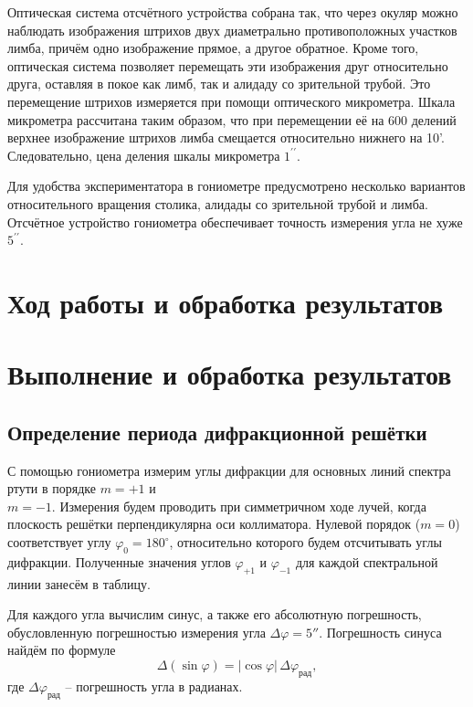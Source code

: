 \documentclass[a4paper]{article}
\begin{document}
Оптическая система отсчётного устройства собрана так, что через окуляр можно наблюдать изображения штрихов двух диаметрально противоположных участков лимба, причём одно изображение прямое, а другое обратное. Кроме того, оптическая система позволяет перемещать эти изображения друг относительно друга, оставляя в покое как лимб, так и алидаду со зрительной трубой. Это перемещение штрихов измеряется при помощи оптического микрометра. Шкала микрометра рассчитана таким образом, что при перемещении её на 600 делений верхнее изображение штрихов лимба смещается относительно нижнего на 10'. Следовательно, цена деления шкалы микрометра $1^{\prime \prime}$.

Для удобства экспериментатора в гониометре предусмотрено несколько вариантов относительного вращения столика, алидады со зрительной трубой и лимба.
Отсчётное устройство гониометра обеспечивает точность измерения угла не хуже $5^{\prime \prime}$.

\section{Ход работы и обработка результатов}

\section{Выполнение и обработка результатов}

\subsection{Определение периода дифракционной решётки}

С помощью гониометра измерим углы дифракции для основных линий спектра ртути в порядке  $m = +1$ и \\ $m = -1$. Измерения будем проводить при симметричном ходе лучей, когда плоскость решётки перпендикулярна оси коллиматора. Нулевой порядок ($m = 0$) соответствует углу $\varphi_0 = 180^\circ$, относительно которого будем отсчитывать углы дифракции. Полученные значения углов $\varphi_{+1}$ и $\varphi_{-1}$ для каждой спектральной линии занесём в таблицу.


Для каждого угла вычислим синус, а также его абсолютную погрешность, обусловленную погрешностью измерения угла $\Delta\varphi = 5''$. Погрешность синуса найдём по формуле
\[
\Delta(\sin\varphi) = |\cos\varphi|\,\Delta\varphi_\text{рад},
\]
где $\Delta\varphi_\text{рад}$ – погрешность угла в радианах.
\end{document}
